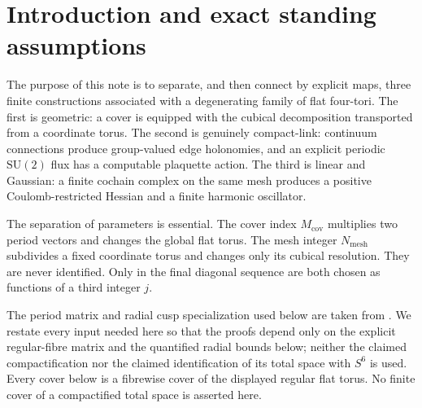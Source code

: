 \documentclass[11pt]{article}
\theoremstyle{definition}
\numberwithin{equation}{section}
\begin{document}
\medskip
\noindent{}

\section{Introduction and exact standing assumptions}

The purpose of this note is to separate, and then connect by explicit maps,
three finite constructions associated with a degenerating family of flat
four-tori.  The first is geometric: a cover is equipped with the cubical
decomposition transported from a coordinate torus.  The second is genuinely
compact-link: continuum connections produce group-valued edge holonomies,
and an explicit periodic \(\mathrm{SU}(2)\) flux has a computable plaquette
action.  The third is linear and Gaussian: a finite cochain complex on the
same mesh produces a positive Coulomb-restricted Hessian and a finite
harmonic oscillator.

The separation of parameters is essential.  The cover index
\(M_{\mathrm{cov}}\) multiplies two period vectors and changes the global
flat torus.  The mesh integer \(N_{\mathrm{mesh}}\) subdivides a fixed
coordinate torus and changes only its cubical resolution.  They are never
identified.  Only in the final diagonal sequence are both chosen as
functions of a third integer \(j\).

The period matrix and radial cusp specialization used below are taken from
\cite{AlpogeS6_2026}.  We restate every input needed here so that the proofs
depend only on the explicit regular-fibre matrix and the quantified radial
bounds below; neither the claimed compactification nor the claimed
identification of its total space with \(S^6\) is used.  Every cover below is
a fibrewise cover of the displayed regular flat torus.  No finite cover of a
compactified total space is asserted here.
\end{document}
